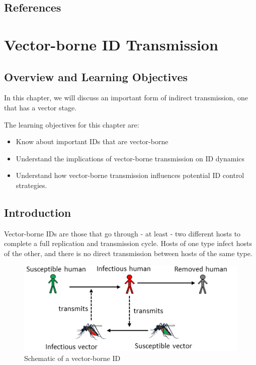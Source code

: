 \documentclass[]{book}
\providecommand{\tightlist}{%
  \setlength{\itemsep}{0pt}\setlength{\parskip}{0pt}}
\theoremstyle{definition}
\theoremstyle{definition}
\theoremstyle{definition}
\theoremstyle{remark}
\begin{document}
\section{References}\label{references-7}

\chapter{Vector-borne ID
Transmission}\label{vector-borne-id-transmission}

\section{Overview and Learning
Objectives}\label{overview-and-learning-objectives-7}

In this chapter, we will discuss an important form of indirect
transmission, one that has a vector stage.

The learning objectives for this chapter are:

\begin{itemize}
\tightlist
\item
  Know about important IDs that are vector-borne
\item
  Understand the implications of vector-borne transmission on ID
  dynamics
\item
  Understand how vector-borne transmission influences potential ID
  control strategies.
\end{itemize}

\section{Introduction}\label{introduction-7}

Vector-borne IDs are those that go through - at least - two different
hosts to complete a full replication and transmission cycle. Hosts of
one type infect hosts of the other, and there is no direct transmission
between hosts of the same type.

\begin{figure}
\centering
\includegraphics{./images/vectorborne-schematic.png}
\caption{Schematic of a vector-borne ID}
\end{figure}
\end{document}
